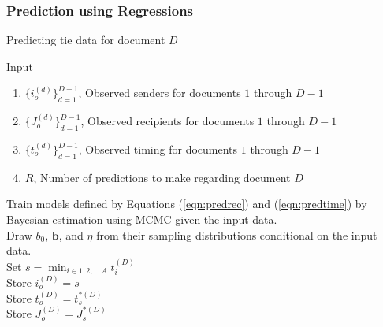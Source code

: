 \documentclass[a4paper]{article}
\begin{document}
              \subsubsection{Prediction using Regressions} \label{subsubsec: Regression PPE}
       \begin{algorithm}[H]
       	\SetAlgoLined
       	\caption{Predicting tie data for document $D$}
       	Input
       	\begin{enumerate}
       		\item $\{i_o^{(d)}\}_{d=1}^{D-1}$, Observed senders for documents $1$ through $D-1$ 
       		\item $\{J_o^{(d)}\}_{d=1}^{D-1}$, Observed recipients for documents $1$ through $D-1$ 
       		\item $\{t_o^{(d)}\}_{d=1}^{D-1}$, Observed timing for documents $1$ through $D-1$
       		\item $R$, Number of predictions to make regarding document $D$
       	\end{enumerate}
       	Train models defined by Equations (\ref{eqn:predrec}) and (\ref{eqn:predtime}) by Bayesian estimation using MCMC given the input data. \\
       	 {
       		Draw $b_0$, $\boldsymbol{b}$, and $\eta$ from their sampling distributions conditional on the input data.\\ 
       		Set  $s = \displaystyle{\min_{i \in 1,2,..,A} } t_i^{(D)}$ \\
       		Store $i_o^{(D)} = s$ \\
       		Store $t_o^{(D)}= t_s^{*(D)}$ \\
       		Store $J_o^{(D)}= J_s^{*(D)}$ \\
       	}
       	\label{alg:docpredict}
       \end{algorithm}
\end{document}
